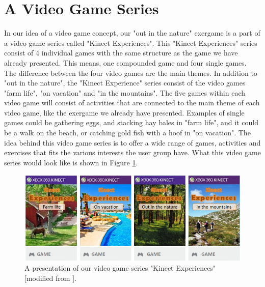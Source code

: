 \section{A Video Game Series}
In our idea of a video game concept, our "out in the nature" exergame is a part of a video game series called "Kinect Experiences". This "Kinect Experiences" series consist of 4 individual games with the same structure as the game we have already presented. This means, one compounded game and four single games. The difference between the four video games are the main themes. In addition to "out in the nature", the "Kinect Experience" series consist of the video games "farm life", "on vacation" and "in the mountains". The five games within each video game will consist of activities that are connected to the main theme of each video game, like the exergame we already have presented. Examples of single games could be gathering eggs, and stacking hay bales in "farm life", and it could be a walk on the beach, or catching gold fish with a hoof in "on vacation". The idea behind this video game series is to offer a wide range of games, activities and exercises that fits the various interests the user group have. What this video game series would look like is shown in Figure \ref{fig:videogameseriesAlone}. 

\begin{figure} [H]
\centering
\includegraphics[scale=0.65]{videoGameSeriesAlone.jpg}
\caption[Presentation of our video game series]{A presentation of our video game series "Kinect Experiences" [modified from \cite{XboxNettside}].}
\label{fig:videogameseriesAlone}
\end{figure}

